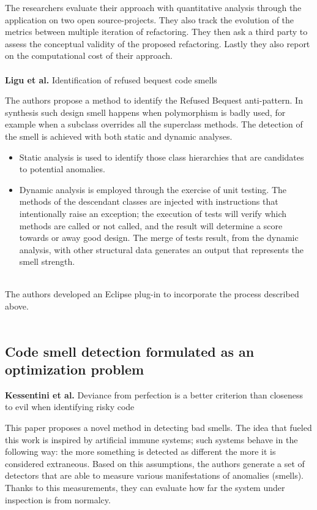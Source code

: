 The researchers evaluate their approach with quantitative analysis through the application on two open source-projects. They also track the evolution of the metrics between multiple iteration of refactoring.
They then ask a third party to assess the conceptual validity of the proposed refactoring.
Lastly they also report on the computational cost of their approach.
\\
\\
\textbf{Ligu et al.} \cite{ligu2013identification} Identification of refused bequest code smells

The authors propose a method to identify the Refused Bequest anti-pattern. In synthesis such design smell happens when polymorphism is badly used, for example when a subclass overrides all the superclass methods.
The detection of the smell is achieved with both static and dynamic analyses.
\begin{itemize}
    \item Static analysis is used to identify those class hierarchies that are candidates to potential anomalies.
    \item Dynamic analysis is employed through the exercise of unit testing. The methods of the descendant classes are injected with instructions that intentionally raise an exception; the execution of tests will verify which methods are called or not called, and the result will determine a score towards or away good design. The merge of tests result, from the dynamic analysis, with other structural data generates an output that represents the smell strength.
\end{itemize}
\\
The authors developed an Eclipse plug-in to incorporate the process described above.
\\
\\
\subsection{Code smell detection formulated as an optimization problem}
\textbf{Kessentini et al.} \cite{kessentini2010deviance} Deviance from perfection is a better criterion than closeness to evil when identifying risky code

This paper proposes a novel method in detecting bad smells. The idea that fueled this work is inspired by artificial immune systems; such systems behave in the following way: the more something is detected as different the more it is considered extraneous.
Based on this assumptions, the authors generate a set of detectors that are able to measure various manifestations of anomalies (smells). Thanks to this measurements, they can evaluate how far the system under inspection is from normalcy. 


